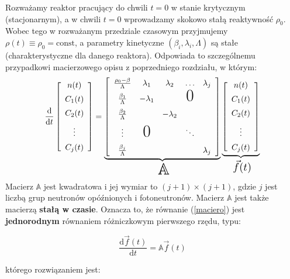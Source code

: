 Rozważamy reaktor pracujący do chwili $t=0$ w stanie krytycznym (stacjonarnym), a w chwili $t=0$ wprowadzamy skokowo stałą reaktywność $\rho_0$.
Wobec tego w rozważanym przedziale czasowym przyjmujemy $\rho(t)\equiv \rho_0=\text{const}$, a parametry kinetyczne $(\beta_i,\lambda_i,\Lambda)$ są stałe (charakterystyczne dla danego reaktora).
Odpowiada to szczególnemu przypadkowi macierzowego opisu z poprzedniego rozdziału, w którym:\begin{equation}
	\frac{\mathrm{d}}{\mathrm{d}t} \left[\begin{array}{c}
		n(t)\\
		\uu{C_1(t)}\\
		\uu{ C_2(t)}\\
		\uu{\vdots}\\
		\uu{C_j(t)}
	\end{array}\right]= 
	\underbrace{
		\left[\begin{array}{ccccc}
			\frac{\rho_0-\beta}{\Lambda}&\lambda_1&\lambda_2&\hdots&\lambda_j\\
			\uu{\frac{\beta_1}{\Lambda}}&-\lambda_1&&\text{\huge0}&\\
			\uu{\frac{\beta_2}{\Lambda}}&&-\lambda_2&&\\
			\uu{\vdots}&\text{\huge0}&&\ddots&\\
			\uu{\frac{\beta_j}{\Lambda}}&&&&\lambda_j
		\end{array}\right]
	}_{\ \Resize{0.5cm}{\mathbb{A}}}
	\underbrace{
		\left[\begin{array}{c}
			n(t)\\
			\uu{C_1(t)}\\
			\uu{ C_2(t)}\\
			\uu{\vdots}\\
			\uu{C_j(t)}
		\end{array}\right]
	}_{\ \Resize{0.8cm}{\vec{f}(t)}}
	\label{maciero}
\end{equation}
\noindent  Macierz $\mathbb{A}$ jest kwadratowa i jej wymiar to $(j+1)\times (j+1)$, gdzie $j$ jest liczbą grup neutronów opóźnionych i fotoneutronów. Macierz $\mathbb{A}$ jest także macierzą \textbf{stałą w czasie}.  Oznacza to, że równanie (\ref{maciero}) jest \textbf{jednorodnym} równaniem różniczkowym pierwszego rzędu, typu:


\begin{equation}
	\frac{\mathrm{d}\vec{f}(t)}{\mathrm{d}t}=\mathbb{A}\vec{f}(t)
	\label{jedno}
\end{equation}

\noindent którego rozwiązaniem jest:

